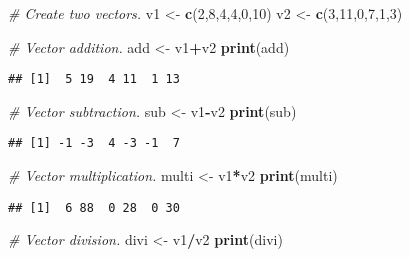 \documentclass[
]{article}
\newenvironment{Shaded}{\begin{snugshade}}{\end{snugshade}}
\newcommand{\CommentTok}[1]{\textcolor[rgb]{0.56,0.35,0.01}{\textit{#1}}}
\newcommand{\DecValTok}[1]{\textcolor[rgb]{0.00,0.00,0.81}{#1}}
\newcommand{\FunctionTok}[1]{\textcolor[rgb]{0.13,0.29,0.53}{\textbf{#1}}}
\newcommand{\NormalTok}[1]{#1}
\newcommand{\OtherTok}[1]{\textcolor[rgb]{0.56,0.35,0.01}{#1}}
\newcommand{\SpecialCharTok}[1]{\textcolor[rgb]{0.81,0.36,0.00}{\textbf{#1}}}
\begin{document}
\begin{Shaded}
\begin{Highlighting}[]
\CommentTok{\# Create two vectors.}
\NormalTok{v1 }\OtherTok{\textless{}{-}} \FunctionTok{c}\NormalTok{(}\DecValTok{2}\NormalTok{,}\DecValTok{8}\NormalTok{,}\DecValTok{4}\NormalTok{,}\DecValTok{4}\NormalTok{,}\DecValTok{0}\NormalTok{,}\DecValTok{10}\NormalTok{)}
\NormalTok{v2 }\OtherTok{\textless{}{-}} \FunctionTok{c}\NormalTok{(}\DecValTok{3}\NormalTok{,}\DecValTok{11}\NormalTok{,}\DecValTok{0}\NormalTok{,}\DecValTok{7}\NormalTok{,}\DecValTok{1}\NormalTok{,}\DecValTok{3}\NormalTok{)}

\CommentTok{\# Vector addition.}
\NormalTok{add }\OtherTok{\textless{}{-}}\NormalTok{ v1}\SpecialCharTok{+}\NormalTok{v2}
\FunctionTok{print}\NormalTok{(add)}
\end{Highlighting}
\end{Shaded}

\begin{verbatim}
## [1]  5 19  4 11  1 13
\end{verbatim}

\begin{Shaded}
\begin{Highlighting}[]
\CommentTok{\# Vector subtraction.}
\NormalTok{sub }\OtherTok{\textless{}{-}}\NormalTok{ v1}\SpecialCharTok{{-}}\NormalTok{v2}
\FunctionTok{print}\NormalTok{(sub)}
\end{Highlighting}
\end{Shaded}

\begin{verbatim}
## [1] -1 -3  4 -3 -1  7
\end{verbatim}

\begin{Shaded}
\begin{Highlighting}[]
\CommentTok{\# Vector multiplication.}
\NormalTok{multi }\OtherTok{\textless{}{-}}\NormalTok{ v1}\SpecialCharTok{*}\NormalTok{v2}
\FunctionTok{print}\NormalTok{(multi)}
\end{Highlighting}
\end{Shaded}

\begin{verbatim}
## [1]  6 88  0 28  0 30
\end{verbatim}

\begin{Shaded}
\begin{Highlighting}[]
\CommentTok{\# Vector division.}
\NormalTok{divi }\OtherTok{\textless{}{-}}\NormalTok{ v1}\SpecialCharTok{/}\NormalTok{v2}
\FunctionTok{print}\NormalTok{(divi)}
\end{Highlighting}
\end{Shaded}
\end{document}
